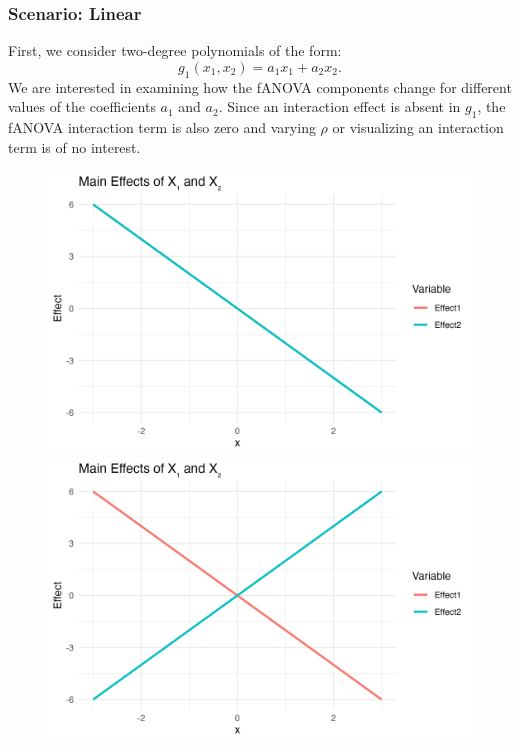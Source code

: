 \subsubsection*{Scenario: Linear}
First, we consider two-degree polynomials of the form:
$$g_1(x_1, x_2) = a_1 x_1 + a_2 x_2.$$
We are interested in examining how the fANOVA components change for different values of the coefficients $a_1$ and $a_2$. 
Since an interaction effect is absent in $g_1$, the fANOVA interaction term is also zero and varying $\rho$ or visualizing an interaction term is of no interest.
\begin{figure}[htpb]
    \centering
    \begin{minipage}[t]{0.49\textwidth}
        \centering
        \includegraphics[width=\textwidth]{images/linear_a1m20_a2m20_a11p00_a22p00_a12p00_rhop00_main.png}
    \end{minipage}%
    \hfill
    \begin{minipage}[t]{0.49\textwidth}
        \centering
        \includegraphics[width=\textwidth]{images/linear_a1m20_a2p20_a11p00_a22p00_a12p00_rhop00_main.png}

\end{minipage}
\end{figure}
